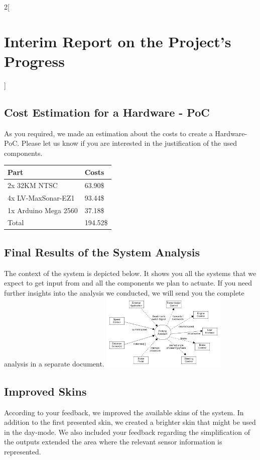 \documentclass[12pt, a4paper, oneside, british]{report}
\begin{document}
\begin{multicols}{2}[\section{Interim Report on the Project's Progress}]
\subsection{Cost Estimation for a Hardware - PoC}
As you required, we made an estimation about the costs to create a Hardware-PoC. Please let us know if you are interested in the justification of the used components.

\vspace{0.25cm}
{\footnotesize
\renewcommand{\arraystretch}{1.5}
\begin{tabular}{ll}
Part & Costs \\
\hline
2x 32KM NTSC & \hspace{0.07cm} 63.90\$ \\
4x LV-MaxSonar-EZ1  & \hspace{0.07cm} 93.44\$ \\
1x Arduino Mega 2560 & \hspace{0.07cm} 37.18\$ \\ 
\hline
Total & 194.52\$
\end{tabular}}

\subsection{Final Results of the System Analysis}
The context of the system is depicted below. It shows you all the systems that we expect to get input from and all the components we plan to actuate. If you need further insights into the analysis we conducted, we will send you the complete analysis in a separate document.
\includegraphics[width=0.45\textwidth]{ContextDiagram.png}

\subsection{Improved Skins}
According to your feedback, we improved the available skins of the system. In addition to the first presented skin, we created a brighter skin that might be used in the day-mode. We also included your feedback regarding the simplification of the outputs extended the area where the relevant sensor information is represented.


\end{multicols}
\end{document}
